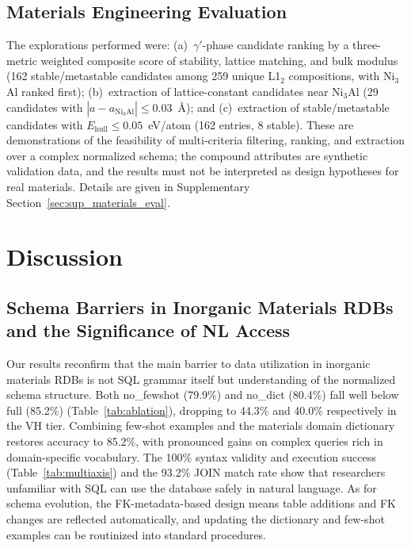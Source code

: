 \subsection{Materials Engineering Evaluation}
\label{sec:materials_evaluation}

The explorations performed were: (a)~$\gamma'$-phase candidate ranking by a three-metric weighted composite score of stability, lattice matching, and bulk modulus (162 stable/metastable candidates among 259 unique L1$_2$ compositions, with Ni$_3$Al ranked first); (b)~extraction of lattice-constant candidates near Ni$_3$Al (29 candidates with $|a - a_{\text{Ni}_3\text{Al}}| \leq 0.03$~\AA{}{}); and (c)~extraction of stable/metastable candidates with $E_\text{hull} \leq 0.05$~eV/atom (162 entries, 8 stable). These are demonstrations of the feasibility of multi-criteria filtering, ranking, and extraction over a complex normalized schema; the compound attributes are synthetic validation data, and the results must not be interpreted as design hypotheses for real materials. Details are given in Supplementary Section~\ref{sec:sup_materials_eval}.


\section{Discussion}
\label{sec:discussion}

\subsection{Schema Barriers in Inorganic Materials RDBs and the Significance of NL Access}

Our results reconfirm that the main barrier to data utilization in inorganic materials RDBs is not SQL grammar itself but understanding of the normalized schema structure. Both no\_fewshot (79.9\%) and no\_dict (80.4\%) fall well below full (85.2\%) (Table~\ref{tab:ablation}), dropping to 44.3\% and 40.0\% respectively in the VH tier. Combining few-shot examples and the materials domain dictionary restores accuracy to 85.2\%, with pronounced gains on complex queries rich in domain-specific vocabulary. The 100\% syntax validity and execution success (Table~\ref{tab:multiaxis}) and the 93.2\% JOIN match rate show that researchers unfamiliar with SQL can use the database safely in natural language. As for schema evolution, the FK-metadata-based design means table additions and FK changes are reflected automatically, and updating the dictionary and few-shot examples can be routinized into standard procedures.

